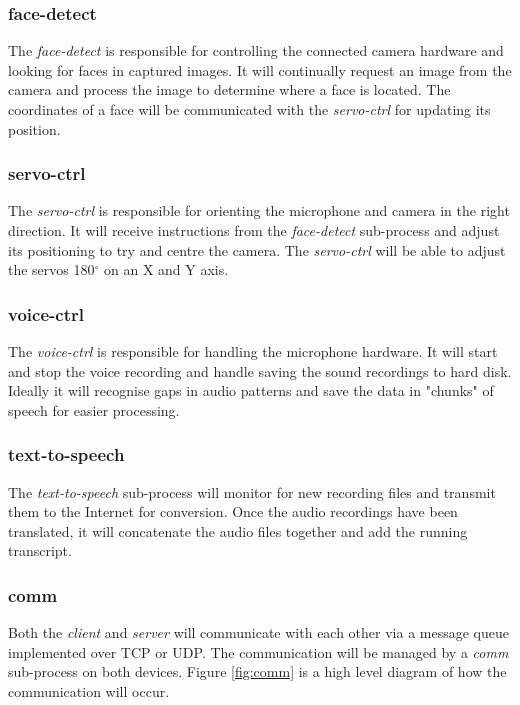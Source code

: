 \documentclass[11pt,a4paper,titlepage]{report}
\begin{document}
\subsubsection{face-detect}

The \textit{face-detect} is responsible for controlling the connected camera hardware and looking for faces in captured images. It will continually request an image from the camera and process the image to determine where a face is located. The coordinates of a face will be communicated with the \textit{servo-ctrl} for updating its position.


\subsubsection{servo-ctrl}

The \textit{servo-ctrl} is responsible for orienting the microphone and camera in the right direction. It will receive instructions from the \textit{face-detect} sub-process and adjust its positioning to try and centre the camera. The \textit{servo-ctrl} will be able to adjust the servos 180$^\circ$ on an X and Y axis.


\subsubsection{voice-ctrl}

The \textit{voice-ctrl} is responsible for handling the microphone hardware. It will start and stop the voice recording and handle saving the sound recordings to hard disk. Ideally it will recognise gaps in audio patterns and save the data in "chunks" of speech for easier processing. 



\subsubsection{text-to-speech}

The \textit{text-to-speech} sub-process will monitor for new recording files and transmit them to the Internet for conversion. Once the audio recordings have been translated, it will concatenate the audio files together and add the running transcript.


\subsubsection{comm}

Both the \textit{client} and \textit{server} will communicate with each other via a message queue implemented over TCP or UDP. The communication will be managed by a \textit{comm} sub-process on both devices. Figure \ref{fig:comm} is a high level diagram of how the communication will occur.
\end{document}
